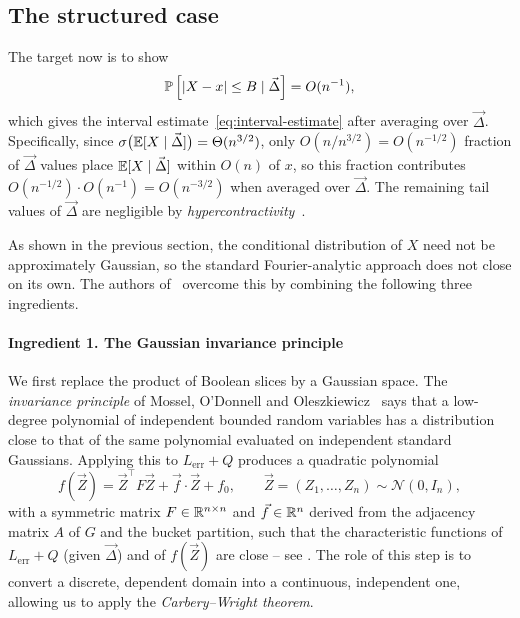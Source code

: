 \subsection{The structured case}
\label{sec:robust-rank}

The target now is to show
\begin{equation}
\label{eq:conditional-target}
  \mathbb{P}\left[|X - x| \leq B \mid \vec\Delta\right] = O(n^{-1}),
\end{equation}
which gives the interval estimate~\eqref{eq:interval-estimate} after averaging over $\vec\Delta$. Specifically, since $\sigma\bigl(\mathbb{E}[X \mid \vec \Delta]\bigr) = \Theta(n^{3/2})$, only $O(n/n^{3/2}) = O(n^{-1/2})$ fraction of $\vec \Delta$ values place $\mathbb{E}[X \mid \vec\Delta]$ within $O(n)$ of $x$, so this fraction contributes $O(n^{-1/2}) \cdot O(n^{-1}) = O(n^{-3/2})$ when averaged over $\vec\Delta$. The remaining tail values of $\vec \Delta$ are negligible by \textit{hypercontractivity}~\cite[Theorem 4.15]{Kwan_2023}. 

As shown in the previous section, the conditional distribution of $X$ need not be approximately Gaussian, so the standard Fourier-analytic approach does not close on its own. The authors of~\cite{Kwan_2023} overcome this by combining the following three ingredients.

\paragraph{Ingredient 1. The Gaussian invariance principle}

We first replace the product of Boolean slices by a Gaussian space. The \textit{invariance principle} of Mossel, O'Donnell and Oleszkiewicz~\cite{mossel2005noisestabilityfunctionslow} says that a low-degree polynomial of independent bounded random variables has a distribution close to that of the same polynomial evaluated on independent standard Gaussians. Applying this to $L_{\text{err}} + Q$ produces a quadratic polynomial
\begin{equation}
\label{eq:gaussian-quadratic}
  f(\vec Z) = \vec Z^{\top} F \vec Z + \vec f \cdot \vec Z + f_0, \qquad \vec Z = (Z_1, \dots, Z_n) \sim \mathcal{N}(0, I_n),
\end{equation}
with a symmetric matrix $F \in \mathbb{R}^{n \times n}$ and $\vec f \in \mathbb{R}^n$ derived from the adjacency matrix $A$ of $G$ and the bucket partition, such that the characteristic functions of $L_{\text{err}} + Q$ (given $\vec\Delta$) and of $f(\vec Z)$ are close -- see \cite[Lemma~11.1]{Kwan_2023}. The role of this step is to convert a discrete, dependent domain into a continuous, independent one, allowing us to apply the \textit{Carbery--Wright theorem}.

